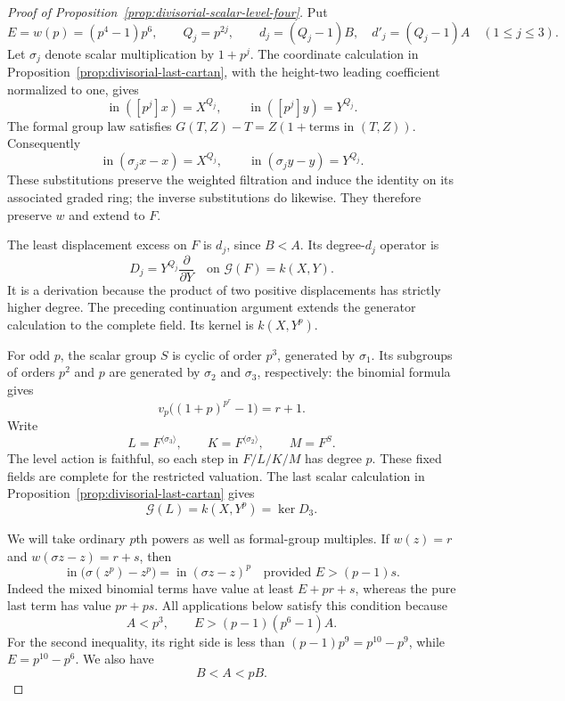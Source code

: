 \begin{proof}[Proof of Proposition~\ref{prop:divisorial-scalar-level-four}]
Put
\[
 E=w(p)=(p^4-1)p^6,\qquad Q_j=p^{2j},
 \qquad d_j=(Q_j-1)B,\quad d'_j=(Q_j-1)A
 \quad(1\le j\le3).
\]
Let $\sigma_j$ denote scalar multiplication by $1+p^j$. The coordinate calculation in Proposition~\ref{prop:divisorial-last-cartan}, with the height-two leading coefficient normalized to one, gives
\begin{equation}\label{eq:divisorial-scalar-displacements}
 \operatorname{in}([p^j]x)=X^{Q_j},\qquad
 \operatorname{in}([p^j]y)=Y^{Q_j}.
\end{equation}
The formal group law satisfies $G(T,Z)-T=Z(1+\text{terms in }(T,Z))$. Consequently
\[
 \operatorname{in}(\sigma_jx-x)=X^{Q_j},\qquad
 \operatorname{in}(\sigma_jy-y)=Y^{Q_j}.
\]
These substitutions preserve the weighted filtration and induce the identity on its associated graded ring; the inverse substitutions do likewise. They therefore preserve $w$ and extend to $F$.

The least displacement excess on $F$ is $d_j$, since $B<A$. Its degree-$d_j$ operator is
\begin{equation}\label{eq:divisorial-scalar-first-derivation}
 D_j=Y^{Q_j}\frac{\partial}{\partial Y}
       \quad\text{on }\mathcal G(F)=k(X,Y).
\end{equation}
It is a derivation because the product of two positive displacements has strictly higher degree. The preceding continuation argument extends the generator calculation to the complete field. Its kernel is $k(X,Y^p)$.

For odd $p$, the scalar group $S$ is cyclic of order $p^3$, generated by $\sigma_1$. Its subgroups of orders $p^2$ and $p$ are generated by $\sigma_2$ and $\sigma_3$, respectively: the binomial formula gives
\[
 v_p\bigl((1+p)^{p^r}-1\bigr)=r+1.
\]
Write
\[
 L=F^{\langle\sigma_3\rangle},\qquad
 K=F^{\langle\sigma_2\rangle},\qquad M=F^S.
\]
The level action is faithful, so each step in $F/L/K/M$ has degree $p$. These fixed fields are complete for the restricted valuation. The last scalar calculation in Proposition~\ref{prop:divisorial-last-cartan} gives
\begin{equation}\label{eq:divisorial-scalar-last-input}
 \mathcal G(L)=k(X,Y^p)=\ker D_3.
\end{equation}

We will take ordinary $p$th powers as well as formal-group multiples. If $w(z)=r$ and $w(\sigma z-z)=r+s$, then
\begin{equation}\label{eq:divisorial-ordinary-power}
 \operatorname{in}\bigl(\sigma(z^p)-z^p\bigr)
       =\operatorname{in}(\sigma z-z)^p
       \quad\text{provided }E>(p-1)s.
\end{equation}
Indeed the mixed binomial terms have value at least $E+pr+s$, whereas the pure last term has value $pr+ps$. All applications below satisfy this condition because
\[
 A<p^3,\qquad
 E>(p-1)(p^6-1)A.
\]
For the second inequality, its right side is less than
$(p-1)p^9=p^{10}-p^9$, while $E=p^{10}-p^6$. We also have
\begin{equation}\label{eq:divisorial-weight-order}
 B<A<pB.
\end{equation}


\end{proof}
